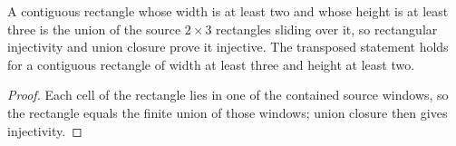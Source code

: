 \begin{lemma}%
    \label{lem:peps_normalSquareWideRectangle_injective}
    \leanok
    A contiguous rectangle whose width is at least two and whose height is at
    least three is the union of the source $2\times3$ rectangles sliding over
    it, so rectangular injectivity and union closure prove it injective. The
    transposed statement holds for a contiguous rectangle of width at least
    three and height at least two.
\end{lemma}
\begin{proof}\leanok
    Each cell of the rectangle lies in one of the contained source windows, so
    the rectangle equals the finite union of those windows; union closure then
    gives injectivity.
\end{proof}

